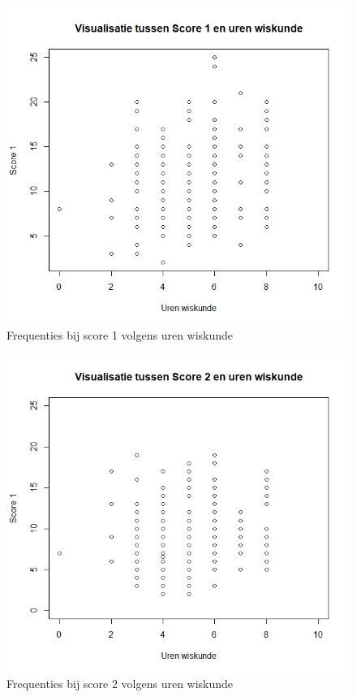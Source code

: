 \documentclass{hogent-article}
\begin{document}
	\begin{figure}[H]
		\includegraphics[width=\linewidth]{img/corr1}
		\caption{Frequenties bij score 1 volgens uren wiskunde}
	\end{figure}
	\begin{figure}[H]
		\includegraphics[width=\linewidth]{img/corr2}
		\caption{Frequenties bij score 2 volgens uren wiskunde}
	\end{figure}
\end{document}
